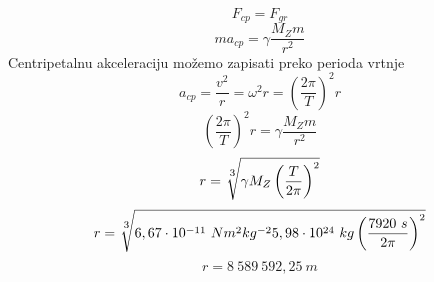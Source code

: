 

$$ F_{cp}=F_{gr} $$
$$ ma_{cp}=\gamma \frac{M_Z m}{r^2}  $$
Centripetalnu akceleraciju možemo zapisati preko perioda vrtnje
$$ a_{cp}=\frac{v^2}{r} = \omega^2r = \left( \frac{2\pi}{T} \right)^2 r $$
$$ \left( \frac{2\pi}{T} \right)^2 r = \gamma \frac{M_Zm}{r^2}$$
$$ r= \sqrt[\leftroot{-1}\uproot{2} \scriptstyle 3]{  \gamma M_Z   \left(\frac{T}{2\pi}  \right)^2}$$
$$ r= \sqrt[\leftroot{-1}\uproot{2} \scriptstyle 3]{  6,67\cdot  10^{-11}\ Nm^2kg^{-2}
5,98 \cdot  10^{24}\ kg   \left(\frac{7920\ s}{2\pi}  \right)^2}$$
$$ r=8\ 589\ 592,25\ m $$

